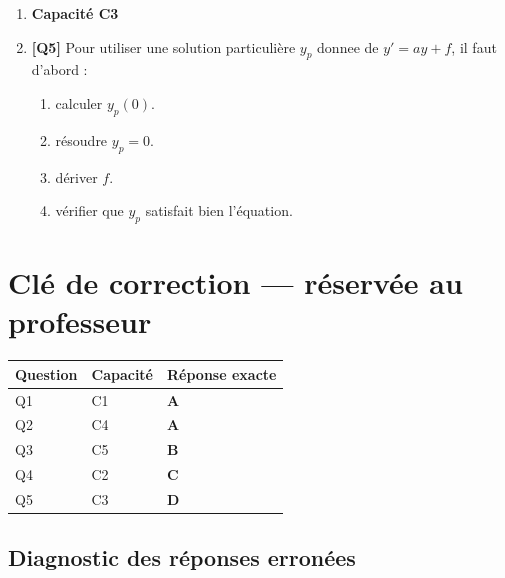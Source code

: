 \begin{enumerate}
\item[] \textbf{Capacité C3}

\item \textbf{[Q5]} Pour utiliser une solution particulière $y_p$ donnee de $y'=ay+f$, il faut d'abord :
  \begin{enumerate}[label=\Alph*.]
    \item calculer $y_p(0)$.
    \item résoudre $y_p=0$.
    \item dériver $f$.
    \item vérifier que $y_p$ satisfait bien l'équation.
  \end{enumerate}

\end{enumerate}

\ifnxVersionProfesseur
\clearpage
\section*{Clé de correction — réservée au professeur}

\begin{center}
\begin{tabular}{lll}
\hline
Question & Capacité & Réponse exacte \\
\hline
Q1 & C1 & \textbf{A} \\
Q2 & C4 & \textbf{A} \\
Q3 & C5 & \textbf{B} \\
Q4 & C2 & \textbf{C} \\
Q5 & C3 & \textbf{D} \\
\hline
\end{tabular}
\end{center}

\subsection*{Diagnostic des réponses erronées}


